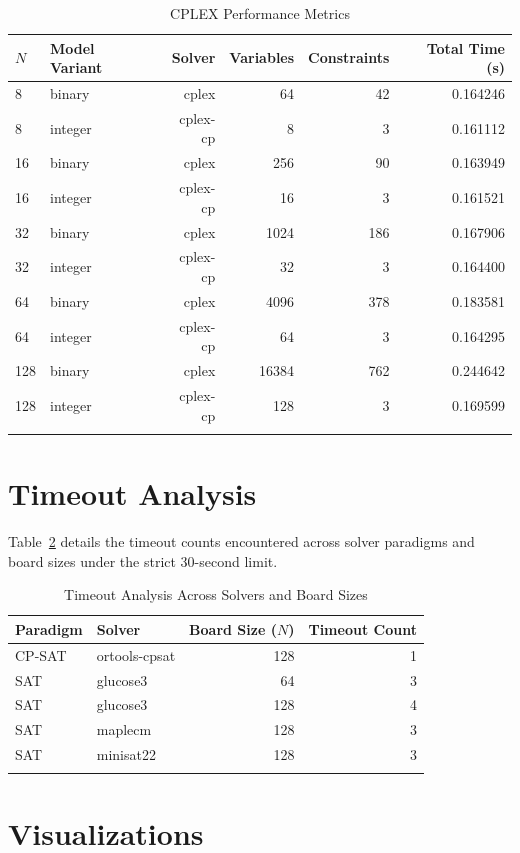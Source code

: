 \documentclass[a4paper,fleqn]{cas-sc}
\begin{document}
\begin{table}[htbp]
\centering
\caption{CPLEX Performance Metrics} \label{tab:cplex}
\begin{tabular}{llrrrr}
\toprule
$N$ & Model Variant & Solver & Variables & Constraints & Total Time (s) \\
\midrule
8 & binary & cplex & 64 & 42 & 0.164246 \\
8 & integer & cplex-cp & 8 & 3 & 0.161112 \\
16 & binary & cplex & 256 & 90 & 0.163949 \\
16 & integer & cplex-cp & 16 & 3 & 0.161521 \\
32 & binary & cplex & 1024 & 186 & 0.167906 \\
32 & integer & cplex-cp & 32 & 3 & 0.164400 \\
64 & binary & cplex & 4096 & 378 & 0.183581 \\
64 & integer & cplex-cp & 64 & 3 & 0.164295 \\
128 & binary & cplex & 16384 & 762 & 0.244642 \\
128 & integer & cplex-cp & 128 & 3 & 0.169599 \\
\bottomrule
\tabularnewline
\end{tabular}
\end{table}

\section{Timeout Analysis}
Table~\ref{tab:timeouts} details the timeout counts encountered across solver paradigms and board sizes under the strict 30-second limit.

\begin{table}[htbp]
\centering
\caption{Timeout Analysis Across Solvers and Board Sizes} \label{tab:timeouts}
\begin{tabular}{llrr}
\toprule
Paradigm & Solver & Board Size ($N$) & Timeout Count \\
\midrule
CP-SAT & ortools-cpsat & 128 & 1 \\
SAT & glucose3 & 64 & 3 \\
SAT & glucose3 & 128 & 4 \\
SAT & maplecm & 128 & 3 \\
SAT & minisat22 & 128 & 3 \\
\bottomrule
\tabularnewline
\end{tabular}
\end{table}

\section{Visualizations}
\end{document}
